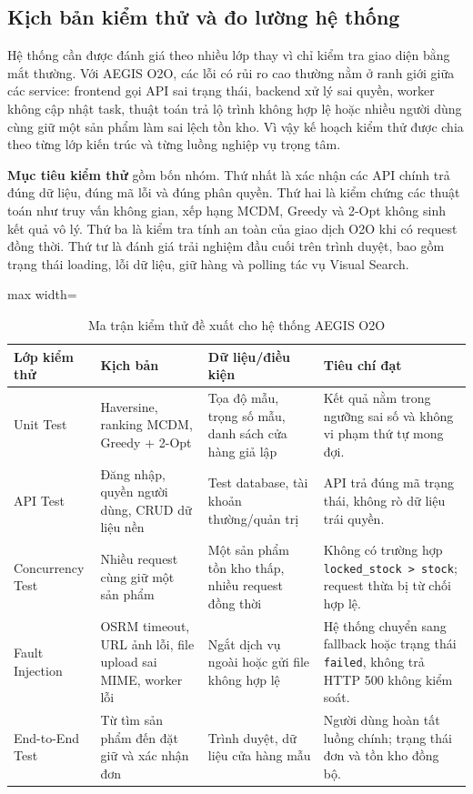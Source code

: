 \documentclass[12pt, a4paper]{article}
\begin{document}
\clearpage

\subsection{Kịch bản kiểm thử và đo lường hệ thống}
Hệ thống cần được đánh giá theo nhiều lớp thay vì chỉ kiểm tra giao diện bằng mắt thường. Với AEGIS O2O, các lỗi có rủi ro cao thường nằm ở ranh giới giữa các service: frontend gọi API sai trạng thái, backend xử lý sai quyền, worker không cập nhật task, thuật toán trả lộ trình không hợp lệ hoặc nhiều người dùng cùng giữ một sản phẩm làm sai lệch tồn kho. Vì vậy kế hoạch kiểm thử được chia theo từng lớp kiến trúc và từng luồng nghiệp vụ trọng tâm.

\textbf{Mục tiêu kiểm thử} gồm bốn nhóm. Thứ nhất là xác nhận các API chính trả đúng dữ liệu, đúng mã lỗi và đúng phân quyền. Thứ hai là kiểm chứng các thuật toán như truy vấn không gian, xếp hạng MCDM, Greedy và 2-Opt không sinh kết quả vô lý. Thứ ba là kiểm tra tính an toàn của giao dịch O2O khi có request đồng thời. Thứ tư là đánh giá trải nghiệm đầu cuối trên trình duyệt, bao gồm trạng thái loading, lỗi dữ liệu, giữ hàng và polling tác vụ Visual Search.

\begin{table}[H]
\centering
\renewcommand{\arraystretch}{1.3}
\small
\begin{adjustbox}{max width=\textwidth}
\begin{tabular}{|>{\raggedright\arraybackslash}p{3.3cm}|>{\raggedright\arraybackslash}p{4.3cm}|>{\raggedright\arraybackslash}p{3.8cm}|>{\raggedright\arraybackslash}p{3.4cm}|}
\hline
\textbf{Lớp kiểm thử} & \textbf{Kịch bản} & \textbf{Dữ liệu/điều kiện} & \textbf{Tiêu chí đạt} \\ \hline
Unit Test & Haversine, ranking MCDM, Greedy + 2-Opt & Tọa độ mẫu, trọng số mẫu, danh sách cửa hàng giả lập & Kết quả nằm trong ngưỡng sai số và không vi phạm thứ tự mong đợi. \\ \hline
API Test & Đăng nhập, quyền người dùng, CRUD dữ liệu nền & Test database, tài khoản thường/quản trị & API trả đúng mã trạng thái, không rò dữ liệu trái quyền. \\ \hline
Concurrency Test & Nhiều request cùng giữ một sản phẩm & Một sản phẩm tồn kho thấp, nhiều request đồng thời & Không có trường hợp \texttt{locked\_stock > stock}; request thừa bị từ chối hợp lệ. \\ \hline
Fault Injection & OSRM timeout, URL ảnh lỗi, file upload sai MIME, worker lỗi & Ngắt dịch vụ ngoài hoặc gửi file không hợp lệ & Hệ thống chuyển sang fallback hoặc trạng thái \texttt{failed}, không trả HTTP 500 không kiểm soát. \\ \hline
End-to-End Test & Từ tìm sản phẩm đến đặt giữ và xác nhận đơn & Trình duyệt, dữ liệu cửa hàng mẫu & Người dùng hoàn tất luồng chính; trạng thái đơn và tồn kho đồng bộ. \\ \hline
\end{tabular}
\end{adjustbox}
\caption{Ma trận kiểm thử đề xuất cho hệ thống AEGIS O2O}
\label{tab:test_matrix}
\end{table}
\end{document}
